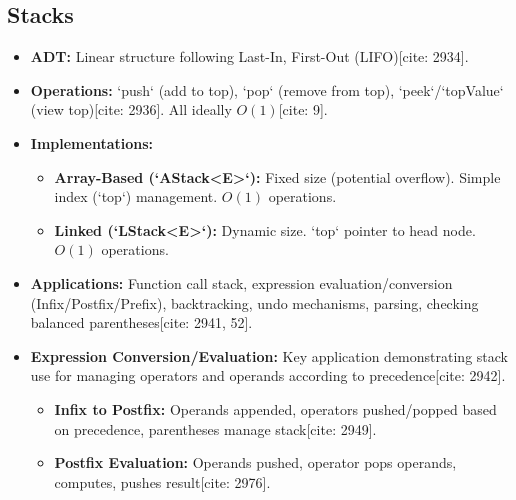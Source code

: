 \documentclass{article}
\begin{document}
\subsection{Stacks}
\begin{itemize}
    \item \textbf{ADT:} Linear structure following Last-In, First-Out (LIFO)[cite: 2934].
    \item \textbf{Operations:} `push` (add to top), `pop` (remove from top), `peek`/`topValue` (view top)[cite: 2936]. All ideally $O(1)$[cite: 9].
    \item \textbf{Implementations:}
          \begin{itemize}
              \item \textbf{Array-Based (`AStack<E>`):} Fixed size (potential overflow). Simple index (`top`) management. $O(1)$ operations.
              \item \textbf{Linked (`LStack<E>`):} Dynamic size. `top` pointer to head node. $O(1)$ operations.
          \end{itemize}
    \item \textbf{Applications:} Function call stack, expression evaluation/conversion (Infix/Postfix/Prefix), backtracking, undo mechanisms, parsing, checking balanced parentheses[cite: 2941, 52].
    \item \textbf{Expression Conversion/Evaluation:} Key application demonstrating stack use for managing operators and operands according to precedence[cite: 2942].
          \begin{itemize}
              \item \textbf{Infix to Postfix:} Operands appended, operators pushed/popped based on precedence, parentheses manage stack[cite: 2949].
              \item \textbf{Postfix Evaluation:} Operands pushed, operator pops operands, computes, pushes result[cite: 2976].
          \end{itemize}
\end{itemize}
\end{document}
